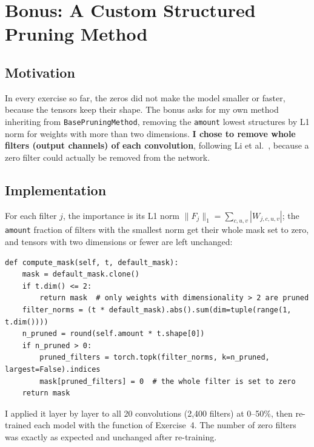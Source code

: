 \documentclass[11pt,a4paper]{article}
\newcommand{\code}[1]{\texttt{#1}}
\begin{document}
\section{Bonus: A Custom Structured Pruning Method}

\subsection{Motivation}
In every exercise so far, the zeros did not make the model smaller or faster, because the tensors keep their shape. The bonus asks for my own method inheriting from \code{BasePruningMethod}, removing the \code{amount} lowest structures by L1 norm for weights with more than two dimensions. \textbf{I chose to remove whole filters (output channels) of each convolution}, following Li et al.~\cite{li2017pruning}, because a zero filter could actually be removed from the network.

\subsection{Implementation}
For each filter $j$, the importance is its L1 norm $\|F_j\|_1 = \sum_{c,u,v} |W_{j,c,u,v}|$; the \code{amount} fraction of filters with the smallest norm get their whole mask set to zero, and tensors with two dimensions or fewer are left unchanged:

\noindent\begin{minipage}{\linewidth}
\begin{lstlisting}
def compute_mask(self, t, default_mask):
    mask = default_mask.clone()
    if t.dim() <= 2:
        return mask  # only weights with dimensionality > 2 are pruned
    filter_norms = (t * default_mask).abs().sum(dim=tuple(range(1, t.dim())))
    n_pruned = round(self.amount * t.shape[0])
    if n_pruned > 0:
        pruned_filters = torch.topk(filter_norms, k=n_pruned, largest=False).indices
        mask[pruned_filters] = 0  # the whole filter is set to zero
    return mask
\end{lstlisting}
\end{minipage}

I applied it layer by layer to all 20 convolutions (2{,}400 filters) at 0--50\%, then re-trained each model with the function of Exercise~4. The number of zero filters was exactly as expected and unchanged after re-training.
\end{document}
